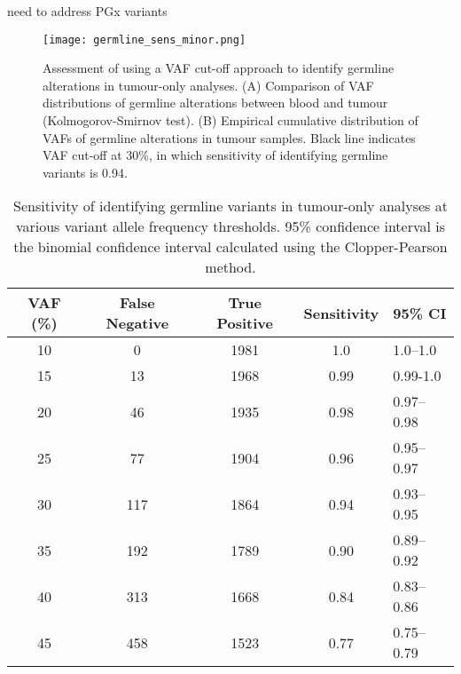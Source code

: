 need to address PGx variants


\begin{figure}[H]
	\texttt{[image: germline\_sens\_minor.png]}
	\caption{Assessment of using a VAF cut-off approach to identify germline alterations in tumour-only analyses. (A) Comparison of VAF distributions of germline alterations between blood and tumour (Kolmogorov-Smirnov test). (B) Empirical cumulative distribution of VAFs of germline alterations in tumour samples. Black line indicates VAF cut-off at 30\%, in which sensitivity of identifying germline variants is 0.94.}
	\label{fig:germline_sens_minor}
\end{figure}


\begin{table}[H]
\caption{Sensitivity of identifying germline variants in tumour-only analyses at various variant allele frequency thresholds. 95\% confidence interval is the binomial confidence interval calculated using the Clopper-Pearson method.}
\label{tbl:sensitivity}
\centering
      \begin{tabular}{ccccl}
        \hline
        VAF (\%) & False Negative & True Positive & Sensitivity & 95\% CI
        \\
        \hline
        10 & 0 & 1981 & 1.0 & 1.0--1.0
        \\
        15 & 13 & 1968 & 0.99 & 0.99-1.0
        \\
        20 & 46 & 1935 & 0.98 & 0.97--0.98
        \\
        25 & 77 & 1904 & 0.96 & 0.95--0.97
        \\
        30 & 117 & 1864 & 0.94 & 0.93--0.95
        \\
        35 & 192 & 1789 & 0.90 & 0.89--0.92
        \\
        40 & 313 & 1668 & 0.84 & 0.83--0.86
        \\
        45 & 458 & 1523 & 0.77 & 0.75--0.79
        \\
				\hline
      \end{tabular} \\
\end{table}



